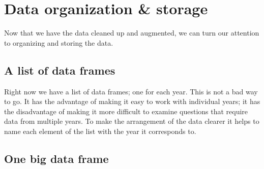 \documentclass[]{book}
\newenvironment{Shaded}{\begin{snugshade}}{\end{snugshade}}
\newcommand{\KeywordTok}[1]{\textcolor[rgb]{0.13,0.29,0.53}{\textbf{#1}}}
\newcommand{\DataTypeTok}[1]{\textcolor[rgb]{0.13,0.29,0.53}{#1}}
\newcommand{\StringTok}[1]{\textcolor[rgb]{0.31,0.60,0.02}{#1}}
\newcommand{\CommentTok}[1]{\textcolor[rgb]{0.56,0.35,0.01}{\textit{#1}}}
\newcommand{\OperatorTok}[1]{\textcolor[rgb]{0.81,0.36,0.00}{\textbf{#1}}}
\newcommand{\NormalTok}[1]{#1}
\begin{document}
\section{Data organization \& storage}\label{data-organization-storage}

Now that we have the data cleaned up and augmented, we can turn our
attention to organizing and storing the data.

\subsection{A list of data frames}\label{a-list-of-data-frames}

Right now we have a list of data frames; one for each year. This is not
a bad way to go. It has the advantage of making it easy to work with
individual years; it has the disadvantage of making it more difficult to
examine questions that require data from multiple years. To make the
arrangement of the data clearer it helps to name each element of the
list with the year it corresponds to.

\begin{Shaded}
\end{Shaded}

\subsection{One big data frame}\label{one-big-data-frame}
\end{document}
